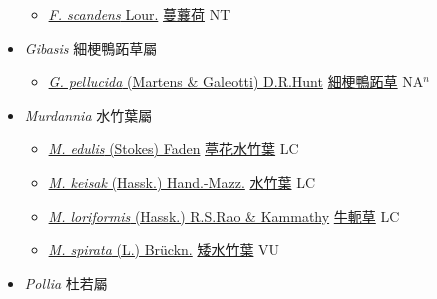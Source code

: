 \begin{itemize}
  \begin{itemize}
        \item[] \href{http://www.theplantlist.org/tpl1.1/search?q=Floscopa+scandens}{\textit{F. scandens} Lour.}   \href{\detokenize{http://taibnet.sinica.edu.tw/chi/taibnet_species_list.php?T2=蔓蘘荷&T2_new_value=true&fr=y}}{蔓蘘荷} NT
  \end{itemize}
 \item[] \textit{Gibasis} 細梗鴨跖草屬
                    
  \begin{itemize}
        \item[] \href{http://www.theplantlist.org/tpl1.1/search?q=Gibasis+pellucida}{\textit{G. pellucida} (Martens \& Galeotti) D.R.Hunt}   \href{\detokenize{http://taibnet.sinica.edu.tw/chi/taibnet_species_list.php?T2=細梗鴨跖草&T2_new_value=true&fr=y}}{細梗鴨跖草} NA$^n$
  \end{itemize}
 \item[] \textit{Murdannia} 水竹葉屬
                    
  \begin{itemize}
        \item[] \href{http://www.theplantlist.org/tpl1.1/search?q=Murdannia+edulis}{\textit{M. edulis} (Stokes) Faden}   \href{\detokenize{http://taibnet.sinica.edu.tw/chi/taibnet_species_list.php?T2=葶花水竹葉&T2_new_value=true&fr=y}}{葶花水竹葉} LC
        \item[] \href{http://www.theplantlist.org/tpl1.1/search?q=Murdannia+keisak}{\textit{M. keisak} (Hassk.) Hand.-Mazz.}   \href{\detokenize{http://taibnet.sinica.edu.tw/chi/taibnet_species_list.php?T2=水竹葉&T2_new_value=true&fr=y}}{水竹葉} LC
        \item[] \href{http://www.theplantlist.org/tpl1.1/search?q=Murdannia+loriformis}{\textit{M. loriformis} (Hassk.) R.S.Rao \& Kammathy}   \href{\detokenize{http://taibnet.sinica.edu.tw/chi/taibnet_species_list.php?T2=牛軛草&T2_new_value=true&fr=y}}{牛軛草} LC
        \item[] \href{http://www.theplantlist.org/tpl1.1/search?q=Murdannia+spirata}{\textit{M. spirata} (L.) Brückn.}   \href{\detokenize{http://taibnet.sinica.edu.tw/chi/taibnet_species_list.php?T2=矮水竹葉&T2_new_value=true&fr=y}}{矮水竹葉} VU
  \end{itemize}
 \item[] \textit{Pollia} 杜若屬
                    

\end{itemize}
